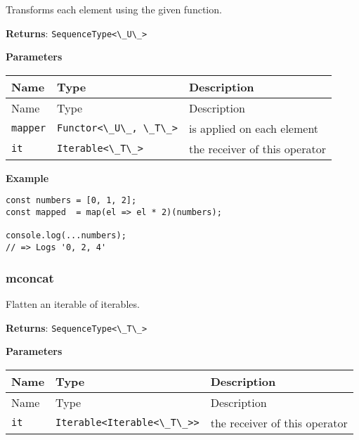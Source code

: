 Transforms each element using the given function.

\textbf{Returns}: \passthrough{\lstinline!SequenceType<\_U\_>!}

\textbf{Parameters}

\begin{longtable}[]{
  >{\raggedright\arraybackslash}p{}
  >{\raggedright\arraybackslash}p{}
  >{\raggedright\arraybackslash}p{}@{}}

\toprule\noalign{}
Name & Type & Description \\
\midrule\noalign{}
\endfirsthead
\toprule\noalign{}
Name & Type & Description \\
\midrule\noalign{}
\endhead
\bottomrule\noalign{}
\endlastfoot
\passthrough{\lstinline!mapper!} &
\passthrough{\lstinline!Functor<\_U\_, \_T\_>!} & is applied on each
element \\
\passthrough{\lstinline!it!} & \passthrough{\lstinline!Iterable<\_T\_>!}
& the receiver of this operator \\
\end{longtable}

\textbf{Example}

\begin{lstlisting}[label=84de7cd1-052e-4191-b5df-e13e9aa8c128]
const numbers = [0, 1, 2];
const mapped  = map(el => el * 2)(numbers);
                                           
console.log(...numbers);
// => Logs '0, 2, 4'
\end{lstlisting}

\hypertarget{3dce9274-3bb4-45df-95d1-5e63e59c508b}{%
\subsubsection{mconcat}\label{3dce9274-3bb4-45df-95d1-5e63e59c508b}}

Flatten an iterable of iterables.

\textbf{Returns}: \passthrough{\lstinline!SequenceType<\_T\_>!}

\textbf{Parameters}

\begin{longtable}[]{
  >{\raggedright\arraybackslash}p{}
  >{\raggedright\arraybackslash}p{}
  >{\raggedright\arraybackslash}p{}@{}}

\toprule\noalign{}
Name & Type & Description \\
\midrule\noalign{}
\endfirsthead
\toprule\noalign{}
Name & Type & Description \\
\midrule\noalign{}
\endhead
\bottomrule\noalign{}
\endlastfoot
\passthrough{\lstinline!it!} &
\passthrough{\lstinline!Iterable<Iterable<\_T\_>>!} & the receiver of
this operator \\
\end{longtable}

